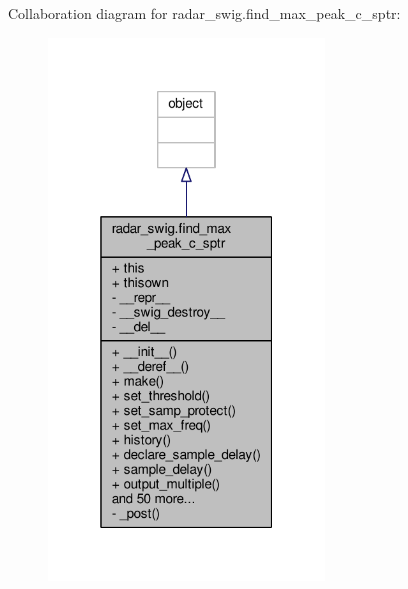 Collaboration diagram for radar\+\_\+swig.\+find\+\_\+max\+\_\+peak\+\_\+c\+\_\+sptr\+:
\nopagebreak
\begin{figure}[H]
\begin{center}
\leavevmode
\includegraphics[width=208pt]{db/d97/classradar__swig_1_1find__max__peak__c__sptr__coll__graph}
\end{center}
\end{figure}

